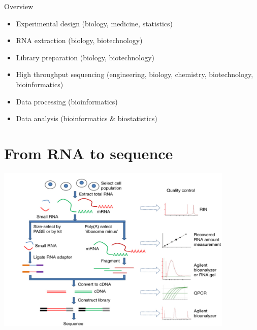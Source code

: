 \documentclass{beamer}\usepackage[]{graphicx}\usepackage[]{color}
\begin{document}
\begin{frame}
\begin{block}{Overview}
\begin{itemize}
\item \color{blue} Experimental design \color{black}(biology, medicine, statistics)
\item \color{blue} RNA extraction \color{black}(biology, biotechnology)
\item \color{blue} Library preparation (\color{black}biology, biotechnology)
\item \color{blue} High throughput sequencing \color{black}(engineering, biology, chemistry, biotechnology, bioinformatics)
\item \color{red} Data processing \color{black} (bioinformatics)
\item \color{red} Data analysis \color{black} (bioinformatics \& biostatistics)
\end{itemize}
\end{block}
\end{frame}


\section{From RNA to sequence}

\begin{frame}
\begin{center}
\includegraphics[height=8cm]{Images/RNA2seq.jpg}
\end{center}
\end{frame}
\end{document}
